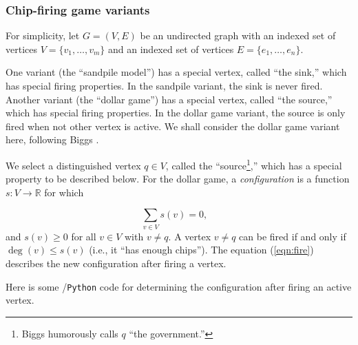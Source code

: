 \subsubsection{Chip-firing game variants}

For simplicity, let $G=(V,E)$ be an undirected graph
with an indexed set of vertices $V=\{v_1,\dots, v_m\}$
and an indexed set of vertices $E=\{e_1,\dots, e_n\}$.

One variant (the ``sandpile model'') has a special vertex,
called ``the sink,'' which has special firing properties.
In the sandpile variant, the sink is never fired.
Another variant (the ``dollar game'') has a special vertex,
called ``the source,'' which has special firing properties.
In the dollar game variant, the source is only fired when
not other vertex is active.
We shall consider the dollar game variant here, following
Biggs \cite{Biggs2007}. 

We select a distinguished vertex $q\in V$, called the
``source\footnote{Biggs humorously calls $q$ ``the government.''},''
which has a special property to be described below.
For the dollar game, a {\it configuration} is a 
function $s:V\to {\mathbb{R}}$ for which 

\[
\sum_{v\in V} s(v) = 0,\ \ \ \
\]
and $s(v)\geq 0$ for all $v\in V$ with $v\not= q$.
A vertex $v\not= q$ can be fired if and only if 
$\deg (v)\leq s(v)$ (i.e., it ``has enough chips'').
The equation (\ref{eqn:fire}) describes the 
new configuration after firing a vertex.

Here is some \sage/{\tt Python} code for determining the
configuration after firing an active vertex.


